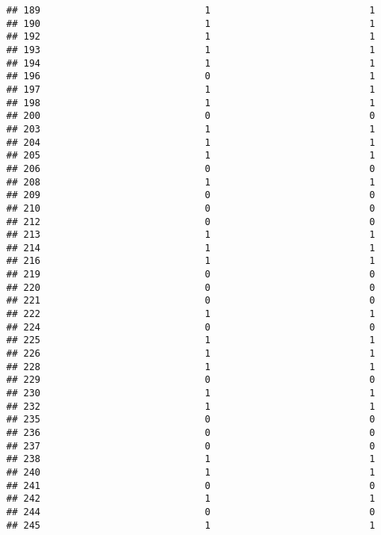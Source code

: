 \documentclass[
]{article}
\begin{document}
\begin{verbatim}
## 189                             1                            1
## 190                             1                            1
## 192                             1                            1
## 193                             1                            1
## 194                             1                            1
## 196                             0                            1
## 197                             1                            1
## 198                             1                            1
## 200                             0                            0
## 203                             1                            1
## 204                             1                            1
## 205                             1                            1
## 206                             0                            0
## 208                             1                            1
## 209                             0                            0
## 210                             0                            0
## 212                             0                            0
## 213                             1                            1
## 214                             1                            1
## 216                             1                            1
## 219                             0                            0
## 220                             0                            0
## 221                             0                            0
## 222                             1                            1
## 224                             0                            0
## 225                             1                            1
## 226                             1                            1
## 228                             1                            1
## 229                             0                            0
## 230                             1                            1
## 232                             1                            1
## 235                             0                            0
## 236                             0                            0
## 237                             0                            0
## 238                             1                            1
## 240                             1                            1
## 241                             0                            0
## 242                             1                            1
## 244                             0                            0
## 245                             1                            1

\end{verbatim}
\end{document}
